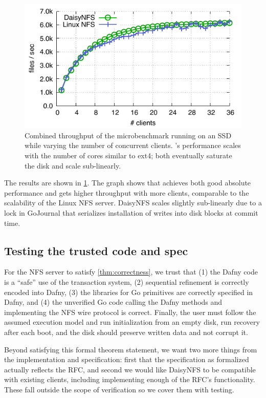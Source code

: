 \begin{figure}
  \includegraphics{daisy-nfs/fig/scale.pdf}
  \caption{Combined throughput of the  microbenchmark running on
    an SSD while
    varying the number of concurrent clients. \sys's performance scales with the
    number of cores similar to ext4; both eventually saturate the disk and scale
    sub-linearly.}
  \label{fig:eval:scale}
\end{figure}

The results are shown in \cref{fig:eval:scale}. The graph shows that \sys
achieves both good absolute performance and gets higher throughput with more
clients, comparable to the scalability of the Linux NFS server.
DaisyNFS scales slightly sub-linearly due to a lock in GoJournal that serializes
installation of writes into disk blocks at commit time.

\subsection{Testing the trusted code and spec}

For the NFS server to satisfy \cref{thm:correctness}, we trust that (1) the
Dafny code is a ``safe'' use of the transaction system, (2) sequential
refinement is correctly encoded into Dafny, (3) the libraries for Go primitives
are correctly specified in Dafny, and (4) the unverified Go code calling the
Dafny methods and implementing the NFS wire protocol is correct. Finally, the
user must follow the assumed execution model and run initialization from an
empty disk, run recovery after each boot, and the disk should preserve written
data and not corrupt it.

Beyond satisfying this formal theorem statement, we want two more things from
the implementation and specification: first that the specification as formalized
actually reflects the RFC, and second we would like DaisyNFS to be compatible
with existing clients, including implementing enough of the RFC's functionality.
These fall outside the scope of verification so we cover them with testing.

